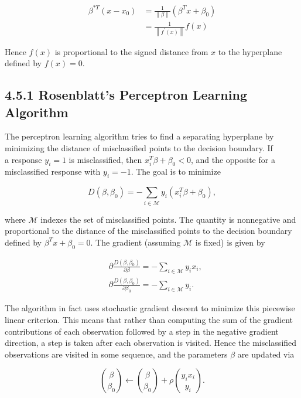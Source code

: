 \documentclass[10pt]{article}
\begin{document}
\begin{align*}
\beta^{* T}\left(x-x_{0}\right) & =\frac{1}{\|\beta\|}\left(\beta^{T} x+\beta_{0}\right) \\
& =\frac{1}{\left\|f^{\prime}(x)\right\|} f(x) \tag{4.40}
\end{align*}


Hence $f(x)$ is proportional to the signed distance from $x$ to the hyperplane defined by $f(x)=0$.

\subsection*{4.5.1 Rosenblatt's Perceptron Learning Algorithm}
The perceptron learning algorithm tries to find a separating hyperplane by minimizing the distance of misclassified points to the decision boundary. If\\
a response $y_{i}=1$ is misclassified, then $x_{i}^{T} \beta+\beta_{0}<0$, and the opposite for a misclassified response with $y_{i}=-1$. The goal is to minimize


\begin{equation*}
D\left(\beta, \beta_{0}\right)=-\sum_{i \in \mathcal{M}} y_{i}\left(x_{i}^{T} \beta+\beta_{0}\right), \tag{4.41}
\end{equation*}


where $\mathcal{M}$ indexes the set of misclassified points. The quantity is nonnegative and proportional to the distance of the misclassified points to the decision boundary defined by $\beta^{T} x+\beta_{0}=0$. The gradient (assuming $\mathcal{M}$ is fixed) is given by


\begin{align*}
& \partial \frac{D\left(\beta, \beta_{0}\right)}{\partial \beta}=-\sum_{i \in \mathcal{M}} y_{i} x_{i},  \tag{4.42}\\
& \partial \frac{D\left(\beta, \beta_{0}\right)}{\partial \beta_{0}}=-\sum_{i \in \mathcal{M}} y_{i} . \tag{4.43}
\end{align*}


The algorithm in fact uses stochastic gradient descent to minimize this piecewise linear criterion. This means that rather than computing the sum of the gradient contributions of each observation followed by a step in the negative gradient direction, a step is taken after each observation is visited. Hence the misclassified observations are visited in some sequence, and the parameters $\beta$ are updated via


\begin{equation*}
\binom{\beta}{\beta_{0}} \leftarrow\binom{\beta}{\beta_{0}}+\rho\binom{y_{i} x_{i}}{y_{i}} . \tag{4.44}
\end{equation*}
\end{document}
